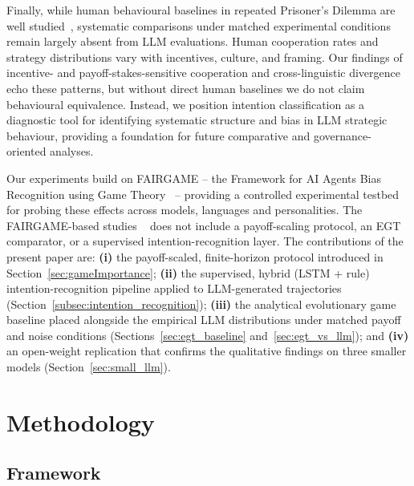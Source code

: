 \documentclass[a4paper,fleqn]{cas-sc}
\begin{document}
Finally, while human behavioural baselines in repeated Prisoner's Dilemma are well studied~\cite{inferenceStrategies,akata2025,Axelrod1980Effective,krockow2016cooperation,sigmund:2010bo}, systematic comparisons under matched experimental conditions remain largely absent from LLM evaluations. Human cooperation rates and strategy distributions vary with incentives, culture, and framing. Our findings of incentive- and payoff-stakes-sensitive cooperation and cross-linguistic divergence echo these patterns, but without direct human baselines we do not claim behavioural equivalence. Instead, we position intention classification as a diagnostic tool for identifying systematic structure and bias in LLM strategic behaviour, providing a foundation for future comparative and governance-oriented analyses.

Our experiments build on FAIRGAME -- the Framework for AI Agents Bias Recognition using Game Theory~\cite{buscemi2025fairgame} -- providing a controlled experimental testbed for probing these effects across models, languages and personalities. The FAIRGAME-based studies ~\cite{buscemi2025fairgame,buscemi2025strategic,balabanova2025media} does not include a payoff-scaling protocol, an EGT comparator, or a supervised intention-recognition layer. The contributions of the present paper are:  \textbf{(i)} the payoff-scaled, finite-horizon protocol introduced in Section~\ref{sec:gameImportance}; \textbf{(ii)} the supervised, hybrid (LSTM + rule) intention-recognition pipeline applied to LLM-generated trajectories (Section~\ref{subsec:intention_recognition}); \textbf{(iii)} the analytical evolutionary game baseline placed alongside the empirical LLM distributions under matched payoff and noise conditions (Sections~\ref{sec:egt_baseline} and~\ref{sec:egt_vs_llm}); and \textbf{(iv)} an open-weight replication that confirms the qualitative findings on three smaller models (Section~\ref{sec:small_llm}). 




\section{Methodology}\label{sec:methodology}


\subsection{Framework}\label{sec:background}
\end{document}
